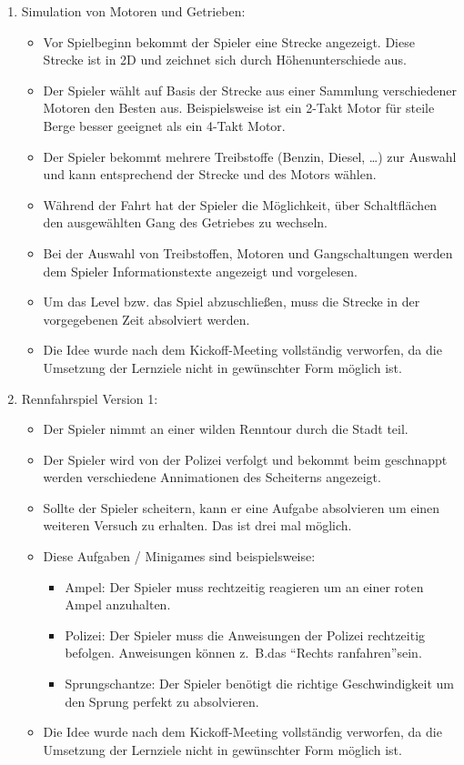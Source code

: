 \begin{enumerate}
\begin{itemize}
		\end{itemize}
		\item{Simulation von Motoren und Getrieben:}
		\begin{itemize}
			\item{Vor Spielbeginn bekommt der Spieler eine Strecke angezeigt. Diese Strecke ist in 2D und zeichnet sich durch Höhenunterschiede aus.}
			\item{Der Spieler wählt auf Basis der Strecke aus einer Sammlung verschiedener Motoren den Besten aus. Beispielsweise ist ein 2-Takt Motor für steile Berge besser geeignet als ein 4-Takt Motor.}
			\item{Der Spieler bekommt mehrere Treibstoffe (Benzin, Diesel, \dots) zur Auswahl und kann entsprechend der Strecke und des Motors wählen.}
			\item{Während der Fahrt hat der Spieler die Möglichkeit, über Schaltflächen den ausgewählten Gang des Getriebes zu wechseln.}
			\item{Bei der Auswahl von Treibstoffen, Motoren und Gangschaltungen werden dem Spieler Informationstexte angezeigt und vorgelesen.}
			\item{Um das Level bzw. das Spiel abzuschließen, muss die Strecke in der vorgegebenen Zeit absolviert werden.}
			\item{Die Idee wurde nach dem Kickoff-Meeting vollständig verworfen, da die Umsetzung der Lernziele nicht in gewünschter Form möglich ist.}
		\end{itemize}
		\item{Rennfahrspiel Version 1:}
		\begin{itemize}
			\item{Der Spieler nimmt an einer wilden Renntour durch die Stadt teil.}
			\item{Der Spieler wird von der Polizei verfolgt und bekommt beim geschnappt werden verschiedene Annimationen des Scheiterns angezeigt.}
			\item{Sollte der Spieler scheitern, kann er eine Aufgabe absolvieren um einen weiteren Versuch zu erhalten. Das ist drei mal möglich.}
			\item{Diese Aufgaben / Minigames sind beispielsweise:}
			\begin{itemize}
				\item{Ampel: Der Spieler muss rechtzeitig reagieren um an einer roten Ampel anzuhalten.}
				\item{Polizei: Der Spieler muss die Anweisungen der Polizei rechtzeitig befolgen. Anweisungen können z.~B.\@ das \enquote{Rechts ranfahren}sein.}
				\item{Sprungschantze: Der Spieler benötigt die richtige Geschwindigkeit um den Sprung perfekt zu absolvieren.}
			\end{itemize}
			\item{Die Idee wurde nach dem Kickoff-Meeting vollständig verworfen, da die Umsetzung der Lernziele nicht in gewünschter Form möglich ist.}
		\end{itemize}
	\end{enumerate}
